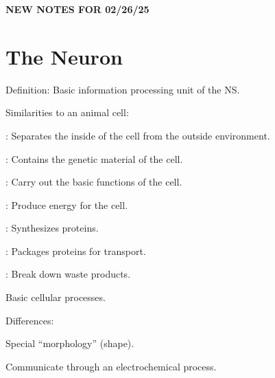 \begin{center}
    \textbf{NEW NOTES FOR 02/26/25} \\
    \hrulefill
\end{center}

\section{The Neuron}

\begin{coloredlist}
    \item Definition: Basic information processing unit of the NS.
    \item Similarities to an animal cell:
    \begin{coloredlist}
        \item {}: Separates the inside of the cell from the outside environment.
        \item {}: Contains the genetic material of the cell.
        \item {}: Carry out the basic functions of the cell.
        \begin{coloredlist}
            \item {}: Produce energy for the cell.
            \item {}: Synthesizes proteins.
            \item {}: Packages proteins for transport.
            \item {}: Break down waste products.
        \end{coloredlist}
        \item Basic cellular processes.
    \end{coloredlist}
    \item Differences:
    \begin{coloredlist}
        \item Special ``morphology'' (shape).
        \item Communicate through an electrochemical process.
    \end{coloredlist}
\end{coloredlist}

